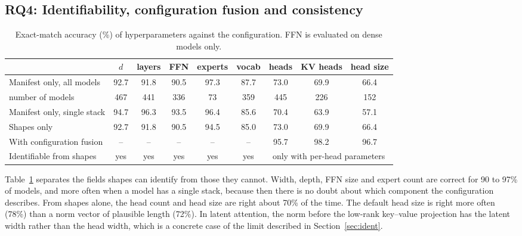 \documentclass[11pt]{article}
\begin{document}
\subsection{RQ4: Identifiability, configuration fusion and consistency}
\label{sec:rq4}

\begin{table}[t]
\centering
\small
\begin{tabular}{lcccccccc}
\toprule
& $d$ & layers & FFN & experts & vocab & heads & KV heads & head size \\
\midrule
Manifest only, all models & 92.7 & 91.8 & 90.5 & 97.3 & 87.7 & 73.0 & 69.9 & 66.4 \\
\quad number of models & 467 & 441 & 336 & 73 & 359 & 445 & 226 & 152 \\
Manifest only, single stack & 94.7 & 96.3 & 93.5 & 96.4 & 85.6 & 70.4 & 63.9 & 57.1 \\
Shapes only & 92.7 & 91.8 & 90.5 & 94.5 & 85.0 & 73.0 & 69.9 & 66.4 \\
With configuration fusion & -- & -- & -- & -- & -- & 95.7 & 98.2 & 96.7 \\
\midrule
Identifiable from shapes & yes & yes & yes & yes & yes & \multicolumn{3}{c}{only with per-head parameters} \\
\bottomrule
\end{tabular}
\caption{Exact-match accuracy (\%) of hyperparameters against the configuration. FFN is evaluated on dense models only.}
\label{tab:hp}
\end{table}

Table~\ref{tab:hp} separates the fields shapes can identify from those they cannot. Width, depth, FFN size and expert count are correct for 90 to 97\% of models, and more often when a model has a single stack, because then there is no doubt about which component the configuration describes. From shapes alone, the head count and head size are right about 70\% of the time. The default head size is right more often (78\%) than a norm vector of plausible length (72\%). In latent attention, the norm before the low-rank key--value projection has the latent width rather than the head width, which is a concrete case of the limit described in Section~\ref{sec:ident}.
\end{document}

